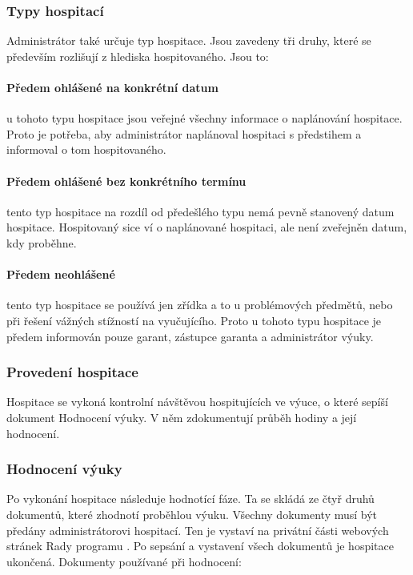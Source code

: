 \subsubsection{Typy hospitací}
Administrátor také určuje typ hospitace. Jsou zavedeny tři druhy, které se především rozlišují z hlediska hospitovaného.  Jsou to:

\paragraph*{Předem ohlášené na konkrétní datum} 
u tohoto typu hospitace jsou veřejné všechny informace o naplánování hospitace. Proto je potřeba, aby administrátor naplánoval hospitaci s předstihem a informoval o tom hospitovaného.

\paragraph*{Předem ohlášené bez konkrétního termínu} 
tento typ hospitace na rozdíl od předešlého typu nemá pevně stanovený datum hospitace. Hospitovaný sice ví o naplánované hospitaci, ale není zveřejněn datum, kdy proběhne.

\paragraph*{Předem neohlášené} 
tento typ hospitace se používá jen zřídka a to u problémových předmětů, nebo při řešení vážných stížností na vyučujícího. Proto u  tohoto typu hospitace je předem informován pouze garant, zástupce garanta a administrátor výuky.

\subsubsection{Provedení hospitace}
Hospitace se vykoná kontrolní návštěvou hospitujících ve výuce, o které sepíší dokument Hodnocení výuky. V něm zdokumentují průběh hodiny a její hodnocení.

\subsubsection{Hodnocení výuky}
Po vykonání hospitace následuje hodnotící fáze. Ta se skládá ze čtyř druhů dokumentů, které zhodnotí proběhlou výuku. Všechny dokumenty musí být předány administrátorovi hospitací. Ten je vystaví na privátní části webových stránek Rady programu \cite{kvalitavyukyweb}. Po sepsání a vystavení všech dokumentů je hospitace ukončená. Dokumenty používané při hodnocení:

